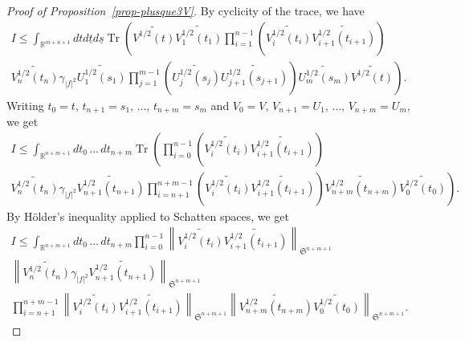 \documentclass[10pt]{amsart}
\theoremstyle{definition}\newtheorem{defi}[theo]{Definition}\newtheorem{rema}[theo]{Remark}\newtheorem{exam}[theo]{Example}\newtheorem{exem}[theo]{Example}\newtheorem{nota}[theo]{Notation}
\newcommand{\R}{\mathbb{R}}
\DeclareMathOperator{\Tr}{Tr}
\newcommand{\frkS}{\mathfrak{S}}
\begin{document}
\begin{proof}[Proof of Proposition~\ref{prop-plusque3V}]
By cyclicity of the trace, we have
\begin{multline*}
I \leq \int_{\R^{m+n+1}} dtd\underline t d\underline s \Tr\left(\widetilde {V^{1/2}(t)} \widetilde{V_1^{1/2}(t_1)} \prod_{i=1}^{n-1} \left(\widetilde{ V_i^{1/2}(t_i)}\widetilde{ V_{i+1}^{1/2}(t_{i+1})} \right)\right.\\
\left.\widetilde{V_n^{1/2}(t_n)} \gamma_{|f|^2} \widetilde{U_1^{1/2}(s_1)} \prod_{j=1}^{m-1}\left(\widetilde{U_j^{1/2}(s_j)} \widetilde{U_{j+1}^{1/2}(s_{j+1})}\right) \widetilde{U_m^{1/2}(s_m)} \widetilde {V^{1/2}(t)}\right).
\end{multline*}
Writing $t_0 = t$, $t_{n+1} = s_1,\,\hdots,\,t_{n+m} = s_m$ and $V_0 = V$, $V_{n+1} = U_1,\,\hdots,\,V_{n+m} = U_m$, we get
\begin{multline*}
I \leq \int_{\R^{n+m+1}} dt_0\,\hdots\,dt_{n+m} \Tr\left(\prod_{i=0}^{n-1} \left(\widetilde{V_i^{1/2}(t_i)}\widetilde{V_{i+1}^{1/2}\left(t_{i+1}\right)} \right)\right.\\
\left.\widetilde{V_n^{1/2}(t_n)} \gamma_{|f|^2} \widetilde{V_{n+1}^{1/2}\left(t_{n+1}\right)} \prod_{i=n+1}^{n+m-1}\left(\widetilde{V_i^{1/2}(t_i)} \widetilde{V_{i+1}^{1/2}\left(t_{i+1}\right)}\right) \widetilde{V_{n+m}^{1/2}\left(t_{n+m}\right)} \widetilde {V_0^{1/2}(t_0)}\right).
\end{multline*}
By H\"older's inequality applied to Schatten spaces, we get
\begin{multline*}
I \leq \int_{\R^{n+m+1}} dt_0\,\hdots\,dt_{n+m} \prod_{i=0}^{n-1} \left\|\widetilde{ V_i^{1/2}(t_i)}\widetilde{V_{i+1}^{1/2}\left(t_{i+1}\right)} \right\|_{\frkS^{n+m+1}}\\
\left\|\widetilde{V_n^{1/2}(t_n)} \gamma_{|f|^2} \widetilde{V_{n+1}^{1/2}\left(t_{n+1}\right)} \right\|_{\frkS^{n+m+1}}\\
\prod_{i=n+1}^{n+m-1}\left\| \widetilde{V_i^{1/2}(t_i)} \widetilde{V_{i+1}^{1/2}(t_{i+1})} \right\|_{\frkS^{n+m+1}}\left\| \widetilde{V_{n+m}^{1/2}\left(t_{n+m}\right)} \widetilde {V_0^{1/2}(t_0)} \right\|_{\frkS^{n+m+1}}.
\end{multline*}


\end{proof}
\end{document}
